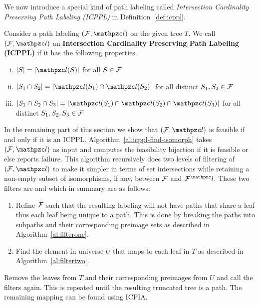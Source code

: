 We now introduce a special kind of path labeling called {\em
  Intersection Cardinality Preserving Path Labeling (ICPPL)} in
Definition~\ref{def:icppl}.

\begin{definition}
  \label{def:icppl}
  Consider a path labeling $(\cF, \cl)$ on the given tree $T$. We call
  $(\cF, \cl)$ an \textbf{Intersection Cardinality Preserving Path
    Labeling (ICPPL)} if it has the following properties.
  \par
  \parbox{\linewidth}{%
    \hangindent {}%
    \begin{enumerate}[i. ] %
      \singlespacing
    \item \label{pr:i} $|S| = |\cl(S)|$ for all $S \in {\cal F}$
    \item \label{pr:ii}$|S_1 \cap S_2| = |\cl(S_1) \cap \cl(S_2)|$ for
    all distinct $S_1, S_2 \in {\cal F}$
    \item \label{pr:iii}$|S_1 \cap S_2 \cap S_3| = |\cl(S_1) \cap
    \cl(S_2) \cap \cl(S_3)|$ for all distinct $S_1, S_2, S_3 \in {\cal F}$
    \end{enumerate}
  }
\end{definition}


In the remaining part of this section we show that $(\cF, \cl)$ is
feasible if and only if it is an ICPPL.
Algorithm~\ref{al:icppl-find-isomorph} takes $(\cF, \cl)$ as input and
computes the feasibility bijection if it is feasible or else reports
failure. This algorithm recursively does two levels of filtering of
$(\cF, \cl)$ to make it simpler in terms of set intersections while
retaining a non-empty subset of isomorphisms, if any, between ${\cal F}$
and $\cF^\cl$. These two filters are \filteri and \filterii which in
summary are as follows:
\begin{enumerate}
\item \filteri Refine ${\cal F}$ such that the resulting
  labeling will not have paths that share a leaf thus each leaf being
  unique to a path. This is done by breaking the paths into subpaths and their
  corresponding preimage sets as described in Algorithm~\ref{al:filterone}.
\item \filterii Find the element in universe $U$ that maps to each
  leaf in $T$ as described in Algorithm~\ref{al:filtertwo}. 
\end{enumerate}
Remove the leaves from $T$ and their corresponding preimages from $U$
and call the filters again. This is repeated until the resulting
truncated tree is a path. The remaining mapping can be found using
ICPIA.

